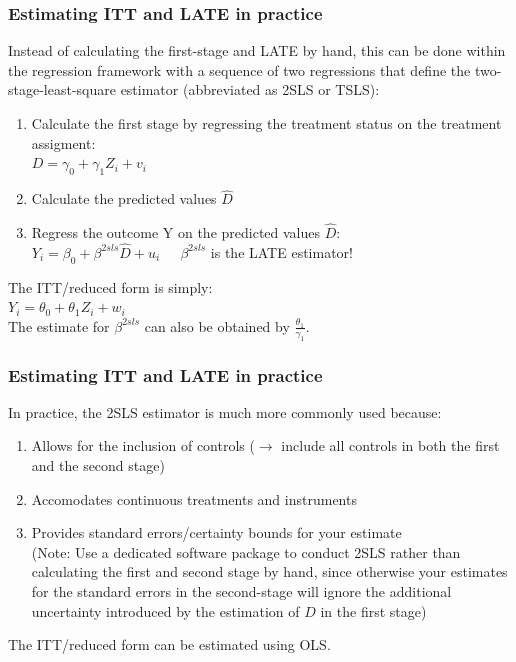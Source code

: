 \documentclass[12pt,english,dvipsnames,aspectratio=169,handout]{beamer}\usepackage[]{graphicx}\usepackage[]{xcolor}
\begin{document}
\begin{frame}
\frametitle{Estimating ITT and LATE in practice}
\footnotesize
Instead of calculating the first-stage and LATE by hand, this can be done within the regression framework with a sequence of two regressions that define the two-stage-least-square estimator (abbreviated as 2SLS or TSLS):\\

\begin{enumerate} \footnotesize
  \item Calculate the first stage by regressing the treatment status on the treatment assigment:\\
   $D = \gamma_0 + \gamma_1 Z_i + v_i$ 
  \item Calculate the predicted values $\hat{D}$
  \item Regress the outcome Y on the predicted values $\hat{D}$: \\
   $Y_i = \beta_0 + \beta^{2sls} \hat{D} + u_i\;\;\;\;$ $\beta^{2sls}$ is the LATE estimator!\\
\end{enumerate}

The ITT/reduced form is simply:\\
$Y_i = \theta_0 + \theta_1 Z_i + w_i$ \\ \vspace{2mm}
\scriptsize The estimate for $\beta^{2sls}$ can also be obtained by $\frac{\theta_1}{\gamma_1}$.
\end{frame}


\begin{frame}
\frametitle{Estimating ITT and LATE in practice}
\footnotesize
In practice, the 2SLS estimator is much more commonly used because:\\

\begin{enumerate} \footnotesize
  \item Allows for the inclusion of controls ($\rightarrow$ include all controls in both the first and the second stage)
  \item Accomodates continuous treatments and instruments
  \item Provides standard errors/certainty bounds for your estimate \\
  (\scriptsize Note: Use a dedicated software package to conduct 2SLS rather than calculating the first and second stage by hand, since otherwise your estimates for the standard errors in the second-stage will ignore the additional uncertainty introduced by the estimation of $\hat{D}$ in the first stage)
\end{enumerate}

The ITT/reduced form can be estimated using OLS.
\vspace{3cm}
\end{frame}
\end{document}
